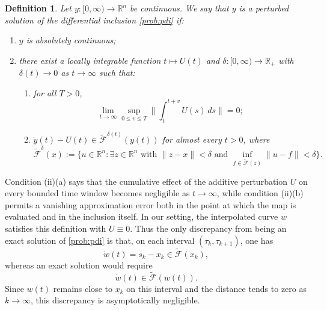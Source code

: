 \documentclass[pdflatex,sn-mathphys-num]{sn-jnl}%
\newcommand\R{\mathbb{R}}
\newcommand\mF{\mathcal{F}}
\newcommand\tmF{\widetilde{\mF}}
\theoremstyle{thmstyleone}%
\theoremstyle{thmstyletwo}%
\theoremstyle{thmstylethree}%
\newtheorem{definition}{Definition}%
\begin{document}
\begin{definition} \label{def:perturbed-soln}
  Let $y : [0,\infty) \to \R^n$ be continuous. We say that $y$ is a perturbed solution of the differential inclusion \eqref{prob:pdi}
  if:
  \begin{enumerate}[label=(\roman*)]
    \item $y$ is absolutely continuous;
    \item there exist a locally integrable function $t \mapsto U(t)$ and $\delta:[0,\infty) \to \R_+$ with $\delta(t)\to 0$ as $t\to\infty$ such that:
    \begin{enumerate}[label=(\alph*)]
      \item for all $T>0$,
      \[
        \lim_{t\to\infty}\sup_{0\leq v\leq T}\bigg\|\int_t^{t+v}U(s)\,ds\bigg\| = 0;
      \]
      \item $\dot y(t)-U(t)\in \tmF^{\delta(t)}(y(t))$
      for almost every $t>0$, where
      \[
        \tmF^\delta(x) := \big\{u\in\R^n : \exists z \in\R^n \text{ with } \|z-x\| < \delta \text{ and } \inf_{f \in \tmF(z)}\|u - f\| < \delta\big\}.
      \]
    \end{enumerate}
  \end{enumerate}
\end{definition}
Condition (ii)(a) says that the cumulative effect of the additive perturbation $U$ on every bounded time window becomes negligible as $t\to\infty$,
while condition (ii)(b) permits a vanishing approximation error both in the point at which the map is evaluated and in the inclusion itself.
In our setting, the interpolated curve $w$ satisfies this definition with $U \equiv 0$. Thus the only discrepancy from being an exact solution of \eqref{prob:pdi} is that, on each interval $(\tau_k,\tau_{k+1})$, one has
\[
  \dot w(t)=s_k-x_k\in \tmF(x_k),
\]
whereas an exact solution would require
\[
  \dot w(t)\in \tmF(w(t)).
\]
Since $w(t)$ remains close to $x_k$ on this interval and the distance tends to zero as $k\to\infty$, this discrepancy is asymptotically negligible.
\end{document}
